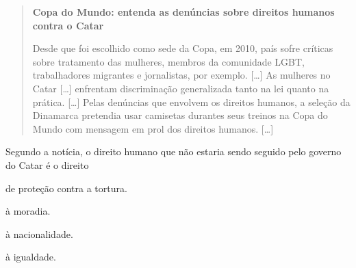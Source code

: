 \begin{quote}
\textbf{Copa do Mundo: entenda as denúncias sobre direitos humanos contra o Catar }

Desde que foi escolhido como sede da Copa, em 2010, país sofre críticas
sobre tratamento das mulheres, membros da comunidade LGBT, trabalhadores
migrantes e jornalistas, por exemplo. {[}\ldots{}{]}
As mulheres no Catar {[}\ldots{}{]}
enfrentam discriminação generalizada tanto na lei quanto na prática. {[}\ldots{}{]}
Pelas denúncias que envolvem os direitos humanos, a seleção da Dinamarca
pretendia usar camisetas durantes seus treinos na Copa do Mundo com
mensagem em prol dos direitos humanos. {[}\ldots{}{]}

\end{quote}

Segundo a notícia, o direito humano que não estaria sendo seguido
pelo governo do Catar é o direito

\begin{minipage}{.5\textwidth}
\begin{escolha}
\item de proteção contra a tortura.

\item à moradia.

\item à nacionalidade.

\item à igualdade.
\end{escolha}
\end{minipage}

